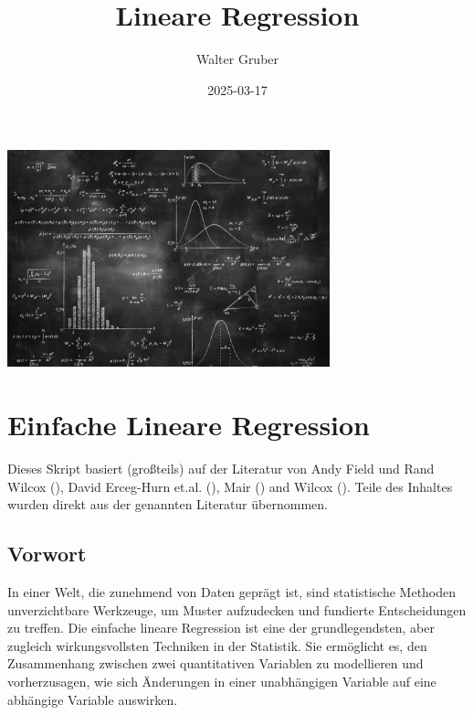 \documentclass[
]{article}
\title{Lineare Regression}
\author{Walter Gruber}
\date{2025-03-17}
\begin{document}
\maketitle

{
\setcounter{tocdepth}{2}
\tableofcontents
}
\section*{}\label{section}

\includegraphics[width=0.7\textwidth,height=\textheight]{Images/TafelFormeln.jpg}

\section*{Einfache Lineare Regression}\label{einfache-lineare-regression}

Dieses Skript basiert (großteils) auf der Literatur von Andy Field und Rand Wilcox (), David Erceg-Hurn et.al. (), Mair () and Wilcox (). Teile des Inhaltes wurden direkt aus der genannten Literatur übernommen.

\subsection*{Vorwort}\label{vorwort}

In einer Welt, die zunehmend von Daten geprägt ist, sind statistische Methoden unverzichtbare Werkzeuge, um Muster aufzudecken und fundierte Entscheidungen zu treffen. Die einfache lineare Regression ist eine der grundlegendsten, aber zugleich wirkungsvollsten Techniken in der Statistik. Sie ermöglicht es, den Zusammenhang zwischen zwei quantitativen Variablen zu modellieren und vorherzusagen, wie sich Änderungen in einer unabhängigen Variable auf eine abhängige Variable auswirken.
\end{document}
